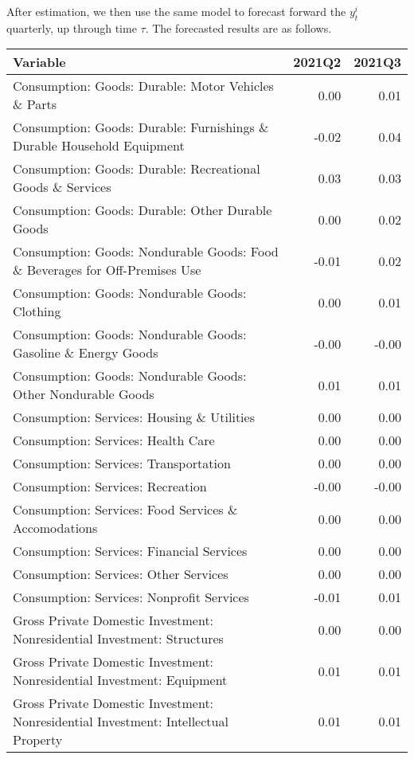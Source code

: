 \documentclass[11pt, letterpaper]{article}\usepackage[]{graphicx}\usepackage[]{color}
\begin{document}
After estimation, we then use the same model to forecast forward the $y^i_t$ quarterly, up through time $\tau$. 
The forecasted results are as follows.
\begin{table}[H]
\centering
\begingroup\scriptsize
\begin{tabular}{lrr}
  \hline
Variable & 2021Q2 & 2021Q3 \\ 
  \hline
Consumption: Goods: Durable: Motor Vehicles \& Parts & 0.00 & 0.01 \\ 
  Consumption: Goods: Durable: Furnishings \& Durable Household Equipment & -0.02 & 0.04 \\ 
  Consumption: Goods: Durable: Recreational Goods \& Services & 0.03 & 0.03 \\ 
  Consumption: Goods: Durable: Other Durable Goods & 0.00 & 0.02 \\ 
  Consumption: Goods: Nondurable Goods: Food \& Beverages for Off-Premises Use & -0.01 & 0.02 \\ 
  Consumption: Goods: Nondurable Goods: Clothing & 0.00 & 0.01 \\ 
  Consumption: Goods: Nondurable Goods: Gasoline \& Energy Goods & -0.00 & -0.00 \\ 
  Consumption: Goods: Nondurable Goods: Other Nondurable Goods & 0.01 & 0.01 \\ 
  Consumption: Services: Housing \& Utilities & 0.00 & 0.00 \\ 
  Consumption: Services: Health Care & 0.00 & 0.00 \\ 
  Consumption: Services: Transportation & 0.00 & 0.00 \\ 
  Consumption: Services: Recreation & -0.00 & -0.00 \\ 
  Consumption: Services: Food Services \& Accomodations & 0.00 & 0.00 \\ 
  Consumption: Services: Financial Services & 0.00 & 0.00 \\ 
  Consumption: Services: Other Services & 0.00 & 0.00 \\ 
  Consumption: Services: Nonprofit Services & -0.01 & 0.01 \\ 
  Gross Private Domestic Investment: Nonresidential Investment: Structures & 0.00 & 0.00 \\ 
  Gross Private Domestic Investment: Nonresidential Investment: Equipment & 0.01 & 0.01 \\ 
  Gross Private Domestic Investment: Nonresidential Investment: Intellectual Property & 0.01 & 0.01 \\ 

\end{tabular}
\end{table}
\end{document}

